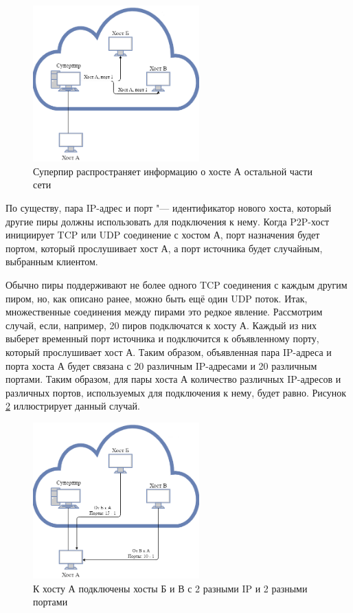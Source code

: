 \documentclass[bachelor, och, coursework]{SCWorks}
\begin{document}
\begin{figure}[H]
    \centering
    \includegraphics[width=0.57\textwidth]{IPPort2.png}
    \caption{Суперпир распространяет информацию о хосте А остальной части сети}
    \label{IPPort2.png}
\end{figure}

По существу, пара IP-адрес и порт "--- идентификатор нового хоста, который другие пиры должны использовать для подключения к нему. Когда P2P-хост инициирует TCP или UDP соединение с хостом А, порт назначения будет портом, который прослушивает хост А, а порт источника будет случайным, выбранным клиентом. 

Обычно пиры поддерживают не более одного TCP соединения с каждым другим пиром, но, как описано ранее, можно быть ещё один UDP поток. Итак, множественные соединения между пирами это редкое явление. Рассмотрим случай, если, например, 20 пиров подключатся к хосту А. Каждый из них выберет временный порт источника и подключится к объявленному порту, который прослушивает хост А. Таким образом, объявленная пара IP-адреса и порта хоста А будет связана с 20 различным IP-адресами и 20 различным портами. Таким образом, для пары хоста А количество различных IP-адресов и различных портов, используемых для подключения к нему, будет равно. Рисунок \ref{IPPort3.png} иллюстрирует данный случай.

\begin{figure}[H]
    \centering
    \includegraphics[width=0.57\textwidth]{IPPort3.png}
    \caption{К хосту А подключены хосты Б и В с 2 разными IP и 2 разными портами}
    \label{IPPort3.png}
\end{figure}
\end{document}
